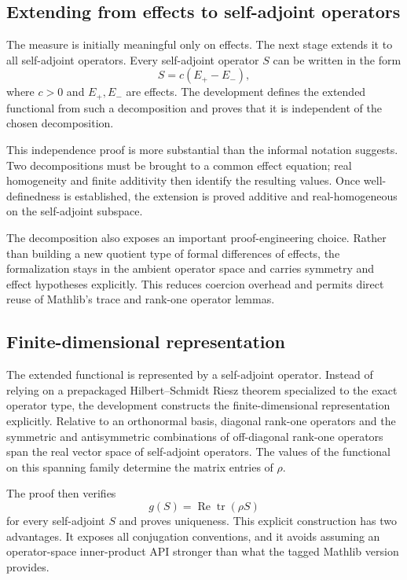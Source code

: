 \documentclass[pdflatex,sn-mathphys-num]{sn-jnl}
\theoremstyle{thmstyleone}
\theoremstyle{thmstylethree}
\begin{document}
\subsection{Extending from effects to self-adjoint operators}\label{extending-from-effects-to-self-adjoint-operators}

The measure is initially meaningful only on effects. The next stage extends it to all self-adjoint operators. Every self-adjoint operator \(S\) can be written in the form \[S=c(E_+-E_-),\] where \(c>0\) and \(E_+,E_-\) are effects. The development defines the extended functional from such a decomposition and proves that it is independent of the chosen decomposition.

This independence proof is more substantial than the informal notation suggests. Two decompositions must be brought to a common effect equation; real homogeneity and finite additivity then identify the resulting values. Once well-definedness is established, the extension is proved additive and real-homogeneous on the self-adjoint subspace.

The decomposition also exposes an important proof-engineering choice. Rather than building a new quotient type of formal differences of effects, the formalization stays in the ambient operator space and carries symmetry and effect hypotheses explicitly. This reduces coercion overhead and permits direct reuse of Mathlib's trace and rank-one operator lemmas.

\subsection{Finite-dimensional representation}\label{finite-dimensional-representation}

The extended functional is represented by a self-adjoint operator. Instead of relying on a prepackaged Hilbert--Schmidt Riesz theorem specialized to the exact operator type, the development constructs the finite-dimensional representation explicitly. Relative to an orthonormal basis, diagonal rank-one operators and the symmetric and antisymmetric combinations of off-diagonal rank-one operators span the real vector space of self-adjoint operators. The values of the functional on this spanning family determine the matrix entries of \(\rho\).

The proof then verifies \[g(S)=\operatorname{Re}\operatorname{tr}(\rho S)\] for every self-adjoint \(S\) and proves uniqueness. This explicit construction has two advantages. It exposes all conjugation conventions, and it avoids assuming an operator-space inner-product API stronger than what the tagged Mathlib version provides.
\end{document}
